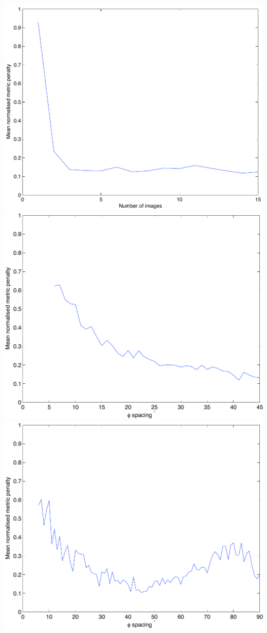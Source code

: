 \documentclass[a4paper, 11pt]{article}
\begin{document}
\includegraphics[scale=0.5]{figures/no_images.pdf}
\includegraphics[scale=0.5]{figures/phi_spacing_45a.pdf}
\includegraphics[scale=0.5]{figures/phi_spacing_90a.pdf}
\end{document}
